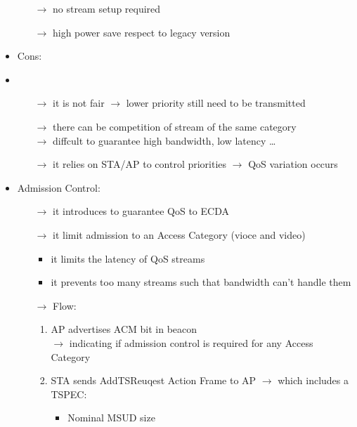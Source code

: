 \begin{itemize}
\begin{itemize}
        \item[$\rightarrow$] no stream setup required
        \item[$\rightarrow$] high power save respect to legacy version 
    \end{itemize}
    \item Cons:
    \item \begin{itemize}
        \item[$\rightarrow$] it is not fair $\rightarrow$ lower priority still need to be transmitted
        \item[$\rightarrow$] there can be competition of stream of the same category\\
        $\rightarrow$ diffcult to guarantee high bandwidth, low latency \dots
        \item[$\rightarrow$] it relies on STA/AP to control priorities $\rightarrow$ QoS variation occurs
    \end{itemize}
    \item Admission Control:
    \begin{itemize}
        \item[$\rightarrow$] it introduces to guarantee QoS to ECDA
        \item[$\rightarrow$] it limit admission to an Access Category (vioce and video)
        \begin{itemize}
            \item it limits the latency of QoS streams
            \item it prevents too many streams such that bandwidth can't handle them
        \end{itemize}
        \item[$\rightarrow$] Flow:
        \begin{enumerate}
            \addtolength{\itemindent}{-0.3cm}
            \item AP advertises ACM bit in beacon\\
           \hspace*{-0.3cm}$\rightarrow$ indicating if admission control is required for any Access Category
           \item STA sends AddTS\footAddTS Reuqest Action Frame to AP $\rightarrow$ which includes a
           \hspace*{-0.3cm}TSPEC:
           \begin{itemize}
            \addtolength{\itemindent}{-0.3cm}
            \item Nominal MSUD size

\end{itemize}
\end{enumerate}
\end{itemize}
\end{itemize}
